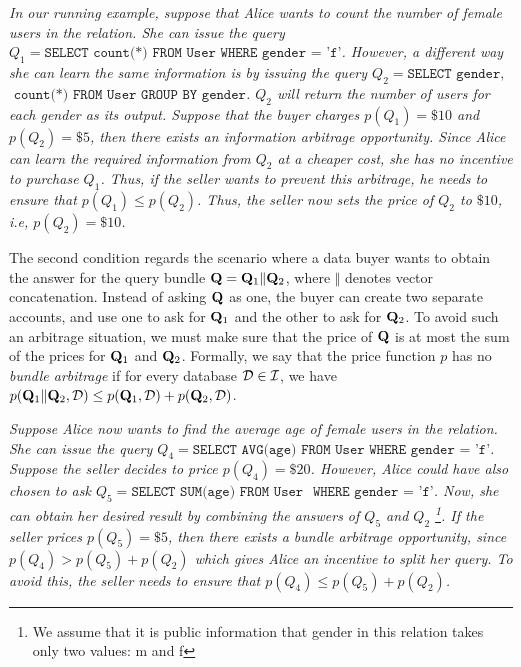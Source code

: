 \begin{example}
	\textit{In our running example, suppose that Alice wants to count the number of female users in the relation. She can issue the query $Q_1 = \texttt{SELECT count(*) FROM User WHERE gender = 'f'}$. However, a different way she can learn the same information is by issuing the query $Q_2 = \texttt{SELECT gender,}$ $\texttt{ count(*) FROM User GROUP BY gender}$. $Q_2$ will return the number of users for each gender as its output. Suppose that the buyer charges $p(Q_1) = \$10$ and $p(Q_2) = \$5$, then there exists an information arbitrage opportunity. Since Alice can learn the required information from $Q_2$ at a {\emph{cheaper}} cost, she has no incentive to purchase $Q_1$. Thus, if the seller wants to prevent this arbitrage, he needs to ensure that $p(Q_1) \leq p(Q_2)$. Thus, the seller now sets the price of $Q_2$ to $\$10$, i.e, $p(Q_2) = \$10$.}
\end{example}

 The second condition regards the scenario where a data buyer wants to obtain the answer for the query bundle $\mathbf{Q} = \mathbf{Q}_1\Vert \mathbf{Q}_2$, where $\Vert$ denotes vector concatenation. Instead of asking $\mathbf{Q}$ as one, the buyer can create two separate accounts, and use one to ask for $\mathbf{Q}_1$ and the other to ask for $\mathbf{Q}_2$. To avoid such an arbitrage situation, we must make sure that the price of $\mathbf{Q}$ is at most the sum of the prices for $\mathbf{Q}_1$ and  $\mathbf{Q}_2$. 
%
Formally, we say that the price function $p$ has no {\em bundle arbitrage} if for every database $\mathcal{D} \in \mathcal{I}$, we have $p(\mathbf{Q}_1\Vert \mathbf{Q}_2, \mathcal{D}) \leq p(\mathbf{Q}_1, \mathcal{D}) + p(\mathbf{Q}_2, \mathcal{D})$. 


\begin{example}
	\textit{Suppose Alice now wants to find the average age of female users in the relation. She can issue the query $Q_4 = \texttt{SELECT AVG(age) FROM User WHERE gender = 'f'}$. Suppose the seller decides to price $p(Q_4) = \$20$. However, Alice could have also chosen to ask $Q_5 = \texttt{SELECT SUM(age) FROM User}$ $\texttt{ WHERE gender = 'f'}$. Now, she can obtain her desired result by combining the answers of $Q_5$ and $Q_2$ \footnote{We assume that it is public information that gender in this relation takes only two values: \textsf{m} and \textsf{f} }. If the seller prices $p(Q_5) = \$5$, then there exists a bundle arbitrage opportunity, since $p(Q_4) > p(Q_5) + p(Q_2)$ which gives Alice an incentive to split her query. To avoid this, the seller needs to ensure that $p(Q_4) \leq p(Q_5) + p(Q_2)$.}
\end{example}


